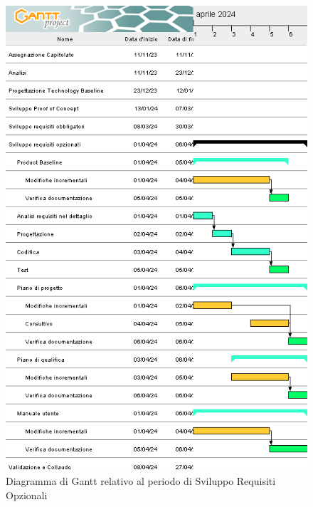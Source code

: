 \documentclass{article}
\begin{document}
\begin{figure}[H]
    \centering
    \includegraphics[width=\textwidth,height=\textheight,keepaspectratio]{documenti/grafici/diagramma-gantt-periodo-sviluppo-requisiti-opzionali.png}
    \caption{Diagramma di Gantt relativo al periodo di Sviluppo Requisiti Opzionali}
    \label{fig:GSROp}
\end{figure}
\end{document}
